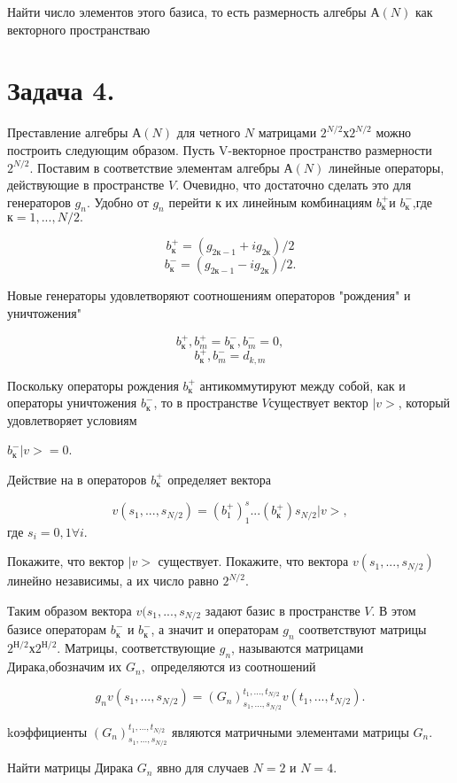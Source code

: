 \documentclass[12pt]{urticle}
\begin{document}
          Найти число элементов этого базиса, то есть размерность алгебры $ А(N) $
          как векторного пространстваю 

\section{Задача 4.} Преставление алгебры $ А(N) $ для четного $ N $ матрицами $ 2^{N/2}х 2^{N/2} $ можно построить
          следующим образом. 
          Пусть V-векторное пространство размерности $ 2^{N/2} $. Поставим
          в   соответствие элементам алгебры $ А(N) $ линейные операторы, действующие в пространстве $ V $.
          Очевидно, что достаточно сделать это для генераторов $ g_n $.
          Удобно от $ g_n $ перейти к их линейным комбинациям  $ b_к^{+}  $и $ b_к^{-} $,где $ к=1,...,N/2. $

           $$  b_к^{+}=(g_{2к-1}+ig_{2к})/2 $$
           $$  b_к^{-}=(g_{2к-1}-ig_{2к})/2. $$

          Новые генераторы удовлетворяют соотношениям операторов "рождения" и уничтожения"

           $$  {b_к^{+},b_m^{+}}={b_к^{-},b_m^{-}}=0, $$
           $$   {b_к^{+},b_m^{-}}=d_{k,m} $$

          Поскольку операторы рождения $  b_к^{+} $ антикоммутируют между собой, как и операторы уничтожения $  b_к^{-} $,
          то в пространстве $ V  $существует вектор $ |v> $, который удовлетворяет условиям 

                $ b_к^{-} |v>=0 $.

          Действие на в операторов $ b_к^{+} $ определяет вектора 

                  $$   v(s_1,...,s_{N/2})=(b_1^{+})^s_1...(b_к^{+})s_{N/2} |v>, $$ где $  s_i=0,1 \forall i $.
             
           Покажите, что вектор $ |v> $ существует.
           Покажите, что вектора  $  v(s_1,...,s_{N/2}) $ линейно независимы, а их число равно $ 2^{N/2}. $
             
            Таким образом вектора $ v(s_1,...,s_{N/2} $ задают базис в пространстве $ V $.
            В этом базисе операторам $ b_к^{-} $ и $ b_к^{-} $, а значит и операторам  $ g_n $ 
            соответствуют матрицы $ 2^{Н/2}х2^{Н/2}. $
            Матрицы, соответствующие $ g_n $, называются матрицами Дирака,обозначим их $ G_n,  $
            определяются из соотношений

               $$  g_n  v(s_1,...,s_{N/2})= (G_n)_{s_1,...,s_{N/2}}^{t_1,...,t_{N/2}} v(t_1,...,t_{N/2}). $$

            kоэффициенты $ (G_n)_{s_1,...,s_{N/2}}^{t_1,...,t_{N/2}} $ являются матричными элементами матрицы $ G_n $.

            Найти матрицы Дирака $ G_n $ явно для случаев $ N=2 $ и $ N=4. $
                
                  
\end{document}
